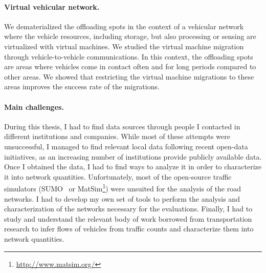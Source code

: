\paragraph{Virtual vehicular network.}
We dematerialized the offloading spots in the context of a vehicular network where the vehicle resources, including storage, but also processing or sensing are virtualized with virtual machines. We studied the virtual machine migration through vehicle-to-vehicle communications. In this context, the offloading spots are areas where vehicles come in contact often and for long periods compared to other areas. We showed that restricting the virtual machine migrations to these areas improves the success rate of the migrations.

\paragraph{Main challenges.}
During this thesis, I had to find data sources through people I contacted in different institutions and companies. While most of these attempts were unsuccessful, I managed to find relevant local data following recent open-data initiatives, as an increasing number of institutions provide publicly available data. Once I obtained the data, I had to find ways to analyze it in order to characterize it into network quantities. Unfortunately, most of the open-source traffic simulators (SUMO~\cite{behrisch2011sumo} or MatSim\footnote{\url{http://www.matsim.org/}}) were unsuited for the analysis of the road networks. I had to develop my own set of tools to perform the analysis and characterization of the networks necessary for the evaluations. Finally, I had to study and understand the relevant body of work borrowed from transportation research to infer flows of vehicles from traffic counts and characterize them into network quantities.


